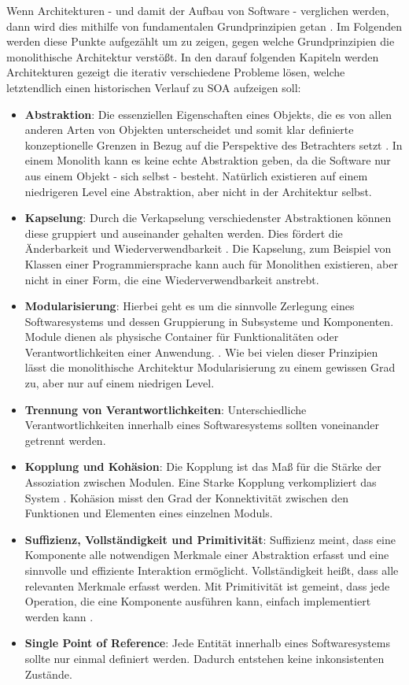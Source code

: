 Wenn Architekturen - und damit der Aufbau von Software - verglichen werden, dann wird dies mithilfe von \glqq fundamentalen Grundprinzipien\grqq{} getan \cite{FrankBuschmann.}. Im Folgenden werden diese Punkte aufgezählt um zu zeigen, gegen welche Grundprinzipien die monolithische Architektur verstößt. In den darauf folgenden Kapiteln werden Architekturen gezeigt die iterativ verschiedene Probleme lösen, welche letztendlich einen historischen Verlauf zu SOA aufzeigen soll:
\begin{itemize}
    \item \textbf{Abstraktion}: \glqq Die essenziellen Eigenschaften eines Objekts, die es von allen anderen Arten von Objekten unterscheidet und somit klar definierte konzeptionelle Grenzen in Bezug auf die Perspektive des Betrachters setzt\grqq{} \cite{Booch.1993}. In einem Monolith kann es keine echte Abstraktion geben, da die Software nur aus einem Objekt - sich selbst - besteht. Natürlich existieren auf einem niedrigeren Level eine Abstraktion, aber nicht in der Architektur selbst.
    \item \textbf{Kapselung}: Durch die Verkapselung verschiedenster Abstraktionen können diese gruppiert und auseinander gehalten werden. Dies fördert die Änderbarkeit und Wiederverwendbarkeit \cite{FrankBuschmann.}. Die Kapselung, zum Beispiel von Klassen einer Programmiersprache kann auch für Monolithen existieren, aber nicht in einer Form, die eine Wiederverwendbarkeit anstrebt.
    \item \textbf{Modularisierung}: Hierbei geht es um die sinnvolle Zerlegung eines Softwaresystems und dessen Gruppierung in Subsysteme und Komponenten. Module dienen als physische Container für Funktionalitäten oder Verantwortlichkeiten einer Anwendung. \cite{FrankBuschmann.}. Wie bei vielen dieser Prinzipien lässt die monolithische Architektur Modularisierung zu einem gewissen Grad zu, aber nur auf einem niedrigen Level.
    \item \textbf{Trennung von Verantwortlichkeiten}: Unterschiedliche Verantwortlichkeiten innerhalb eines Softwaresystems sollten voneinander getrennt werden. 
    \item \textbf{Kopplung und Kohäsion}: Die Kopplung ist das Maß für die Stärke der Assoziation zwischen Modulen. Eine Starke Kopplung verkompliziert das System \cite{FrankBuschmann.}. Kohäsion misst den Grad der Konnektivität zwischen den Funktionen und Elementen eines einzelnen Moduls.
    \item \textbf{Suffizienz, Vollständigkeit und Primitivität}: Suffizienz meint, dass eine Komponente alle notwendigen Merkmale einer Abstraktion erfasst und eine sinnvolle und effiziente Interaktion ermöglicht. Vollständigkeit heißt, dass alle relevanten Merkmale erfasst werden. Mit Primitivität ist gemeint, dass jede Operation, die eine Komponente ausführen kann, einfach implementiert werden kann \cite{FrankBuschmann.}.
    \item \textbf{Single Point of Reference}: Jede Entität innerhalb eines Softwaresystems sollte nur einmal definiert werden. Dadurch entstehen keine inkonsistenten Zustände.
\end{itemize}

